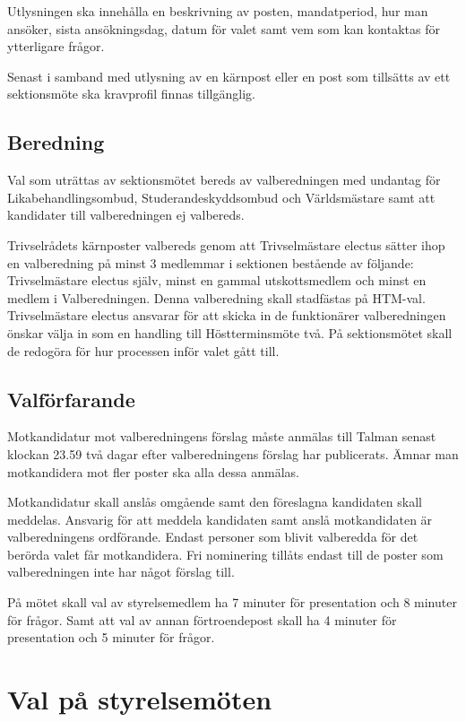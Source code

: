 \documentclass{dsekprotokoll}
\begin{document}
Utlysningen ska innehålla en beskrivning av posten, mandatperiod, hur man ansöker, sista  ansökningsdag, datum för valet samt vem som kan kontaktas för ytterligare frågor.

Senast i samband med utlysning av en kärnpost eller en post som tillsätts av ett sektionsmöte ska kravprofil finnas tillgänglig.

\subsection{Beredning}
Val som uträttas av sektionsmötet bereds av valberedningen med undantag för Likabehandlingsombud, Studerandeskyddsombud och Världsmästare samt att kandidater till valberedningen ej valbereds.

Trivselrådets kärnposter valbereds genom att Trivselmästare electus sätter ihop en valberedning på minst 3 medlemmar i sektionen bestående av följande: Trivselmästare electus själv, minst en gammal utskottsmedlem och minst en medlem i Valberedningen. Denna valberedning skall stadfästas på HTM-val. Trivselmästare electus ansvarar för att skicka in de funktionärer valberedningen önskar välja in som en handling till Höstterminsmöte två. På sektionsmötet skall de redogöra för hur processen inför valet gått till.

\subsection{Valförfarande}
Motkandidatur mot valberedningens förslag måste anmälas till Talman senast klockan 23.59 två dagar efter valberedningens förslag har publicerats. Ämnar man motkandidera mot fler poster ska alla dessa anmälas.

Motkandidatur skall anslås omgående samt den föreslagna kandidaten skall meddelas. Ansvarig för att meddela kandidaten samt anslå motkandidaten är valberedningens ordförande. Endast personer som blivit valberedda för det berörda valet får motkandidera.
Fri nominering tillåts endast till de poster som valberedningen inte har något förslag till.

På mötet skall val av styrelsemedlem ha 7 minuter för presentation och 8 minuter för frågor. Samt att val av annan förtroendepost skall ha 4 minuter för presentation och 5 minuter för frågor.

\section{Val på styrelsemöten}
\end{document}
